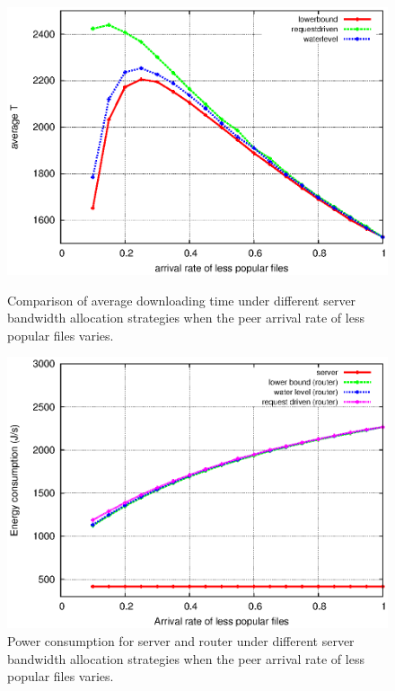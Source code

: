 \documentclass[conference]{IEEEtran}
\begin{document}
\begin{figure}[ht]
\centering
\begin{minipage}[b]{0.3\linewidth}
	\includegraphics[scale=0.4]{graphs/pop.eps}
	\caption{Comparison of average downloading time under different server bandwidth allocation strategies when the peer arrival rate of less popular files varies.}
	\label{fig:popsimulation}
\end{minipage}
\hfill
\centering
\begin{minipage}[b]{0.3\linewidth}
	\includegraphics[scale=0.4]{graphs/componentconsumption.eps}
	\caption{Power consumption for server and router under different server bandwidth allocation strategies when the peer arrival rate of less popular files varies.}
	\label{fig:componentpop}
\end{minipage}
\hfill

\end{figure}
\end{document}
